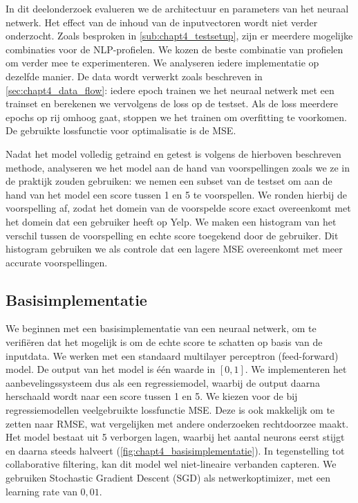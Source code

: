 In dit deelonderzoek evalueren we de architectuur en parameters van het neuraal netwerk. Het effect van de inhoud van de inputvectoren wordt niet verder onderzocht. Zoals besproken in \autoref{sub:chapt4_testsetup}, zijn er meerdere mogelijke combinaties voor de NLP-profielen. We kozen de beste combinatie van profielen om verder mee te experimenteren. We analyseren iedere implementatie op dezelfde manier. De data wordt verwerkt zoals beschreven in \autoref{sec:chapt4_data_flow}: iedere epoch trainen we het neuraal netwerk met een trainset en berekenen we vervolgens de loss op de testset. Als de loss meerdere epochs op rij omhoog gaat, stoppen we het trainen om overfitting te voorkomen. De gebruikte lossfunctie voor optimalisatie is de MSE.

Nadat het model volledig getraind en getest is volgens de hierboven beschreven methode, analyseren we het model aan de hand van voorspellingen zoals we ze in de praktijk zouden gebruiken: we nemen een subset van de testset om aan de hand van het model een score tussen 1 en 5 te voorspellen. We ronden hierbij de voorspelling af, zodat het domein van de voorspelde score exact overeenkomt met het domein dat een gebruiker heeft op Yelp. We maken een histogram van het verschil tussen de voorspelling en echte score toegekend door de gebruiker. Dit histogram gebruiken we als controle dat een lagere MSE overeenkomt met meer accurate voorspellingen.

\subsection{Basisimplementatie}
\label{sec:chapt4_basisimplementatie}
We beginnen met een basisimplementatie van een neuraal netwerk, om te verifiëren dat het mogelijk is om de echte score te schatten op basis van de inputdata. We werken met een standaard multilayer perceptron (feed-forward) model. De output van het model is één waarde in $[0, 1]$. We implementeren het aanbevelingssysteem dus als een regressiemodel, waarbij de output daarna herschaald wordt naar een score tussen 1 en 5. We kiezen voor de bij regressiemodellen veelgebruikte lossfunctie MSE. Deze is ook makkelijk om te zetten naar RMSE, wat vergelijken met andere onderzoeken rechtdoorzee maakt. \cite{narre, deepconn, wide_deep_learning_paper}
Het model bestaat uit 5 verborgen lagen, waarbij het aantal neurons eerst stijgt en daarna steeds halveert (\autoref{fig:chapt4_basisimplementatie}). In tegenstelling tot collaborative filtering, kan dit model wel niet-lineaire verbanden capteren. We gebruiken Stochastic Gradient Descent (SGD) als netwerkoptimizer, met een learning rate van $0,01$.

